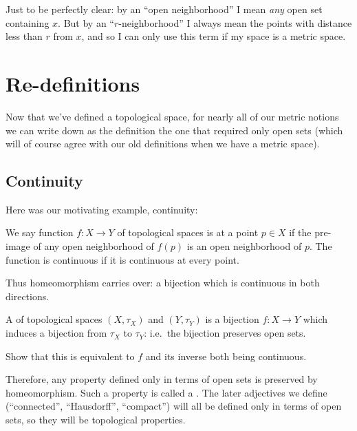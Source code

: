 \begin{abuse}
	Just to be perfectly clear:
	by an ``open neighborhood'' I mean \emph{any} open set containing $x$.
	But by an ``$r$-neighborhood'' I always mean the
	points with distance less than $r$ from $x$,
	and so I can only use this term if my space is a metric space.
\end{abuse}

\section{Re-definitions}
Now that we've defined a topological space,
for nearly all of our metric notions we can write down
as the definition the one that required only open sets
(which will of course agree with our old definitions
when we have a metric space).

\subsection{Continuity}
Here was our motivating example, continuity:
\begin{definition}
	We say function $f \colon X \to Y$ of topological spaces
	is  at a point $p \in X$ if the pre-image of any
	open neighborhood of $f(p)$ is an open neighborhood of $p$.
	The function is continuous if it is continuous at every point.
\end{definition}

Thus homeomorphism carries over:
a bijection which is continuous in both directions.
\begin{definition}
	A  of topological spaces
	$(X, \tau_X)$ and $(Y, \tau_Y)$
	is a bijection $f \colon X \to Y$
	which induces a bijection from $\tau_X$ to $\tau_Y$:
	i.e.\ the bijection preserves open sets.
\end{definition}
\begin{ques}
	Show that this is equivalent to $f$ and its inverse
	both being continuous.
\end{ques}
Therefore, any property defined only in
terms of open sets is preserved by homeomorphism.
Such a property is called a .
The later adjectives we define
(``connected'', ``Hausdorff'', ``compact'') will all be defined
only in terms of open sets, so they will be topological properties.



